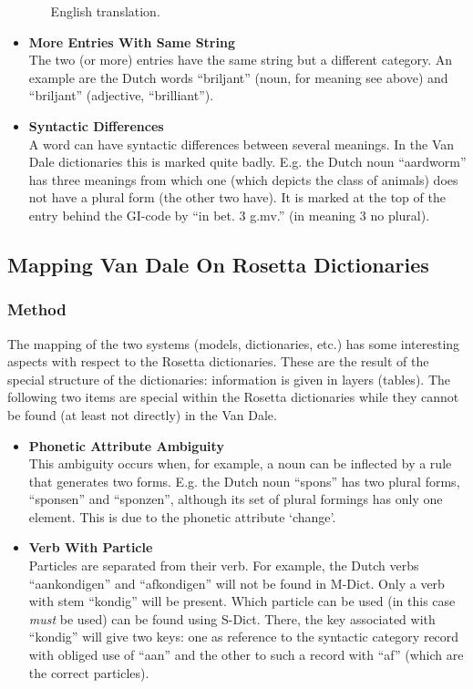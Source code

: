 \begin{itemize}
\begin{enumerate}
                 English translation.
        \end{enumerate}
  \item {\bf More Entries With Same String}\\
        The two (or more) entries have the same string but a different category.
        An example are the Dutch words ``briljant'' (noun, for meaning see 
        above) and ``briljant'' (adjective, ``brilliant''). 
  \item {\bf Syntactic Differences}\\
        A word can have syntactic differences between several meanings.
        In the Van Dale dictionaries this is marked quite badly. E.g. the Dutch
        noun ``aardworm'' has three meanings from which one (which depicts the 
        class of animals) does not have a plural form (the other two have).
        It is marked at the top of the entry behind the GI-code by 
        ``in bet. 3 g.mv.'' (in meaning 3 no plural).
\end{itemize}
 
\subsection{Mapping Van Dale On Rosetta Dictionaries}
 
\subsubsection{Method}
 
The mapping of the two systems (models, dictionaries, etc.) has some
interesting aspects with respect to the Rosetta dictionaries. These are the
result of the special structure of the dictionaries: information is given in
layers (tables). The following two items are special within the Rosetta 
dictionaries while they cannot be found (at least not directly) in the Van Dale.
 
\begin{itemize}
  \item {\bf Phonetic Attribute Ambiguity}\\
        This ambiguity occurs when, for example, a noun can be inflected by a 
        rule that generates two forms. E.g. the Dutch noun ``spons'' has two 
        plural forms, ``sponsen'' and ``sponzen'', although its set of plural
        formings has only one element. This is due to the phonetic attribute 
        `change'.
  \item {\bf Verb With Particle}\\
        Particles are separated from their verb. For example, the Dutch verbs
        ``aankondigen'' and ``afkondigen'' will not be found in M-Dict. Only
        a verb with stem ``kondig'' will be present. Which particle can be used 
        (in this case {\em must} be used) can be found using S-Dict. There, the 
        key associated with ``kondig'' will give two keys: one as reference to 
        the syntactic category record with obliged use of ``aan'' and the
        other to such a record with ``af'' (which are the correct particles).
\end{itemize}
 
